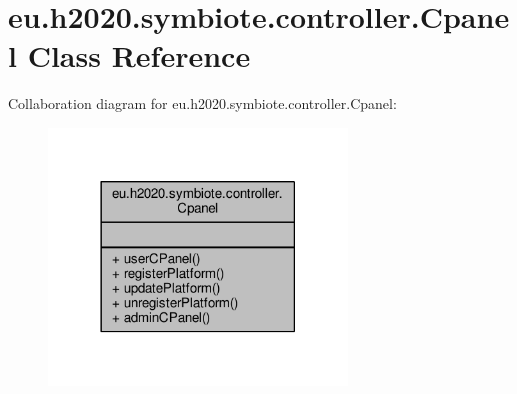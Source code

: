 \hypertarget{classeu_1_1h2020_1_1symbiote_1_1controller_1_1Cpanel}{}\section{eu.\+h2020.\+symbiote.\+controller.\+Cpanel Class Reference}
\label{classeu_1_1h2020_1_1symbiote_1_1controller_1_1Cpanel}


Collaboration diagram for eu.\+h2020.\+symbiote.\+controller.\+Cpanel\+:
\nopagebreak
\begin{figure}[H]
\begin{center}
\leavevmode
\includegraphics[width=225pt]{classeu_1_1h2020_1_1symbiote_1_1controller_1_1Cpanel__coll__graph}
\end{center}
\end{figure}
